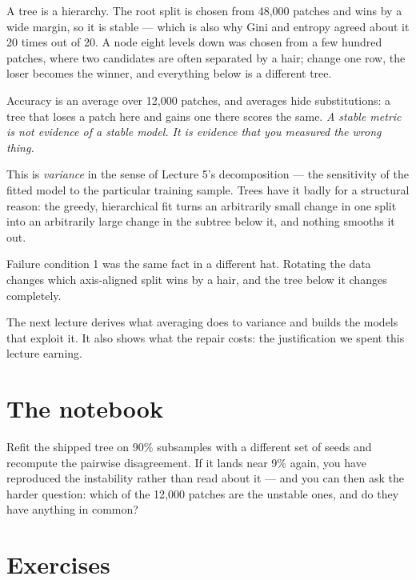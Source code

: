\documentclass[11pt,a4paper]{article}
\begin{document}
\begin{keybox}[title={The part you put on a slide is stable. The part that decides is not.}]
A tree is a hierarchy. The root split is chosen from 48{,}000 patches and wins
by a wide margin, so it is stable --- which is also why Gini and entropy agreed
about it 20 times out of 20. A node eight levels down was chosen from a few
hundred patches, where two candidates are often separated by a hair; change one
row, the loser becomes the winner, and everything below is a different tree.

Accuracy is an average over 12{,}000 patches, and averages hide substitutions:
a tree that loses a patch here and gains one there scores the same. \emph{A
stable metric is not evidence of a stable model. It is evidence that you
measured the wrong thing.}
\end{keybox}

This is \emph{variance} in the sense of Lecture 5's decomposition --- the
sensitivity of the fitted model to the particular training sample. Trees have
it badly for a structural reason: the greedy, hierarchical fit turns an
arbitrarily small change in one split into an arbitrarily large change in the
subtree below it, and nothing smooths it out.

Failure condition 1 was the same fact in a different hat. Rotating the data
changes which axis-aligned split wins by a hair, and the tree below it changes
completely.

The next lecture derives what averaging does to variance and builds the models
that exploit it. It also shows what the repair costs: the justification we
spent this lecture earning.

\section{The notebook}

\begin{trybox}[title={What to change}]
Refit the shipped tree on 90\% subsamples with a different set of seeds and
recompute the pairwise disagreement. If it lands near 9\% again, you have
reproduced the instability rather than read about it --- and you can then ask
the harder question: which of the 12{,}000 patches are the unstable ones, and
do they have anything in common?
\end{trybox}

\section{Exercises}
\end{document}
